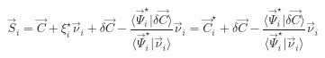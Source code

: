 \documentclass[aps,12pt]{revtex4}
\begin{document}
\begin{equation}
	\vec{S}_i = \vec{C} + \xi_i^\star \vec{\nu}_i
 + \delta\vec{C} - \dfrac{\langle \vec{\Psi}_i^\star \vert \delta\vec{C} \rangle}{\langle \vec{\Psi}_i^\star \vert \vec{\nu}_i \rangle
} \vec{\nu}_i = \vec{C}_i^\star + \delta\vec{C} - \dfrac{\langle \vec{\Psi}_i^\star \vert \delta\vec{C} \rangle}{\langle \vec{\Psi}_i^\star \vert \vec{\nu}_i \rangle
} \vec{\nu}_i
\end{equation} 
 
\end{document}
